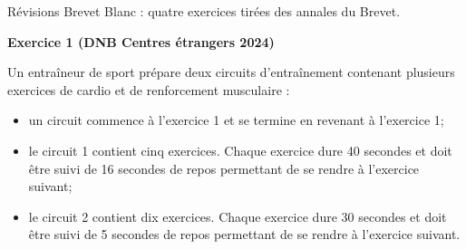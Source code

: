\documentclass{article}
\begin{document}
\begin{center}\LARGE
    Révisions Brevet Blanc : quatre exercices tirées des annales du Brevet.
\end{center}

\textbf{Exercice 1 (DNB Centres étrangers 2024)}

\medskip

Un entraîneur de sport prépare deux circuits d'entraînement contenant plusieurs exercices de cardio et de renforcement musculaire :

\begin{itemize}[label=\textbullet]
	\item un circuit commence à l'exercice 1 et se termine en revenant à l'exercice 1;
	\item le circuit 1 contient cinq exercices. Chaque exercice dure 40 secondes et doit être suivi de 16 secondes de repos permettant de se rendre à l'exercice suivant;
	\item le circuit 2 contient dix exercices. Chaque exercice dure 30 secondes et doit être suivi de 5 secondes de repos permettant de se rendre à l'exercice suivant.
\end{itemize}

\begin{center}
\hfill~

\end{center}
\end{document}
